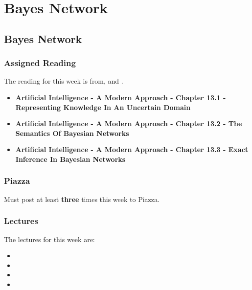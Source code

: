 \clearpage

\renewcommand{\ChapTitle}{Bayes Network}
\renewcommand{\SectionTitle}{Bayes Network}

\chapter{\ChapTitle}

\section{\SectionTitle}

\subsection{Assigned Reading}

The reading for this week is from, \AITextbook \hspace*{1pt} and \RLTextbook.

\begin{itemize}
    \item \textbf{Artificial Intelligence - A Modern Approach - Chapter 13.1 - Representing Knowledge In An Uncertain Domain}
    \item \textbf{Artificial Intelligence - A Modern Approach - Chapter 13.2 - The Semantics Of Bayesian Networks}
    \item \textbf{Artificial Intelligence - A Modern Approach - Chapter 13.3 - Exact Inference In Bayesian Networks}
\end{itemize}

\subsection{Piazza}

Must post at least \textbf{three} times this week to Piazza.

\subsection{Lectures}

The lectures for this week are:

\begin{itemize}
    \item {}
    \item {}
    \item {}
    \item {}
\end{itemize}

